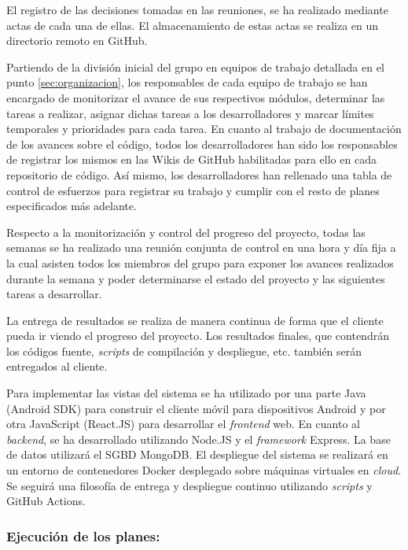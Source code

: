 \documentclass{article}
\begin{document}
El registro de las decisiones tomadas en las reuniones, se ha realizado mediante actas de cada una de ellas. El almacenamiento de estas actas se realiza en un directorio remoto en GitHub.

Partiendo de la división inicial del grupo en equipos de trabajo detallada en el punto \ref{sec:organizacion}, los responsables de cada equipo de trabajo se han encargado de monitorizar el avance de sus respectivos módulos, determinar las tareas a realizar, asignar dichas tareas a los desarrolladores y marcar límites temporales y prioridades para cada tarea. En cuanto al trabajo de documentación de los avances sobre el código, todos los desarrolladores han sido los responsables de registrar los mismos en las Wikis de GitHub habilitadas para ello en cada repositorio de código. Así mismo, los desarrolladores han rellenado una tabla de control de esfuerzos para registrar su trabajo y cumplir con el resto de planes especificados más adelante.

\pagebreak

Respecto a la monitorización y control del progreso del proyecto, todas las semanas se ha realizado una reunión conjunta de control en una hora y día fija a la cual asisten todos los miembros del grupo para exponer los avances realizados durante la semana y poder determinarse el estado del proyecto y las siguientes tareas a desarrollar.

La entrega de resultados se realiza de manera continua de forma que el cliente pueda ir viendo el progreso del proyecto. Los resultados finales, que contendrán los códigos fuente, \textit{scripts} de compilación y despliegue, etc. también serán entregados al cliente.

Para implementar las vistas del sistema se ha utilizado por una parte Java (Android SDK) para construir el cliente móvil para dispositivos Android y por otra JavaScript (React.JS) para desarrollar el \textit{frontend} web. En cuanto al \textit{backend}, se ha desarrollado utilizando Node.JS y el \textit{framework} Express. La base de datos utilizará el SGBD MongoDB. El despliegue del sistema se realizará en un entorno de contenedores Docker desplegado sobre máquinas virtuales en \textit{cloud}. Se seguirá una filosofía de entrega y despliegue continuo utilizando \textit{scripts} y GitHub Actions.

\subsubsection*{Ejecución de los planes:}
\end{document}
